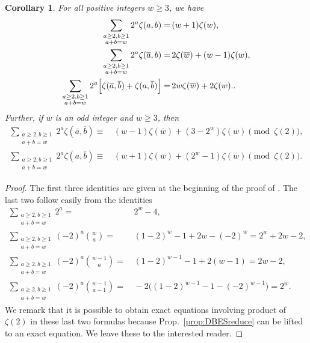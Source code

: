 \documentclass{article}
\newcommand{\ol}{\overline}
\theoremstyle{plain}
\newtheorem{cor}[thm]{Corollary}
\theoremstyle{definition}
\begin{document}
\begin{cor}\label{cor:ESWtSumFormula}
\label{conj:WtSumFormula}
For all positive integers $w\ge 3$, we have
\begin{align}
  \sum_{\substack{a\ge 2,b\ge 1\\ a+b=w}} 2^a \zeta(a,b)=&\, (w+1)\zeta(w), \notag\\
  \sum_{\substack{a\ge 2,b\ge 1\\ a+b=w}} 2^a \zeta(\ol{a},b)=&\, 2\zeta(\ol{w}) + (w-1)\zeta(w),  \notag\\
  \sum_{\substack{a\ge 2,b\ge 1\\ a+b=w}} 2^a \Big[\zeta(\ol{a},\ol{b})+\zeta(a,\ol{b})\Big]= &\, 2w\zeta(\ol{w})+2\zeta(w).
  \label{equ:WtSumES(a,barb)AND(a,barb)}.
\end{align}
Further, if $w$ is an odd integer and $w\ge 3$, then
\begin{align*}
  \sum_{\substack{a\ge 2,b\ge 1\\ a+b=w}} 2^a \zeta(\ol{a},\ol{b})\equiv &\, (w-1)\zeta(\ol{w})+(3-2^w)\zeta(w)  \pmod{\zeta(2)},\\
  \sum_{\substack{a\ge 2,b\ge 1\\ a+b=w}} 2^a \zeta(a,\ol{b})\equiv &\, (w+1)\zeta(\ol{w})+(2^w-1)\zeta(w)\pmod{\zeta(2)}.
\end{align*}
\end{cor}
\begin{proof}
The first three identities are given at the beginning of the proof of \cite[Theorem 4.4]{BCJXXZhao2020c}.
The last two follow easily from the identities
\begin{align}
  \sum_{\substack{a\ge 2,b\ge 1\\ a+b=w}}  2^a  =&\, 2^w-4,    \label{equ:CombId1}\\
  \sum_{\substack{a\ge 2,b\ge 1\\ a+b=w}}  (-2)^a \binom{w}{a}=&\, (1-2)^w-1+2w-(-2)^w=2^w+2w-2,  \label{equ:CombId2}\\
  \sum_{\substack{a\ge 2,b\ge 1\\ a+b=w}}  (-2)^a \binom{w-1}{a}=&\, (1-2)^{w-1}-1+2(w-1)=2w-2,  \label{equ:CombId3}\\
  \sum_{\substack{a\ge 2,b\ge 1\\ a+b=w}}  (-2)^a \binom{w-1}{a-1}=&\, -2\big((1-2)^{w-1}-1-(-2)^{w-1}\big)=2^w.  \label{equ:CombId4}
\end{align}
We remark that it is possible to obtain exact equations involving product of $\zeta(2)$ in these last two formulas because Prop.~\ref{prop:DBESreduce} can be lifted to an exact equation. We leave these to the interested reader.
\end{proof}
\end{document}
